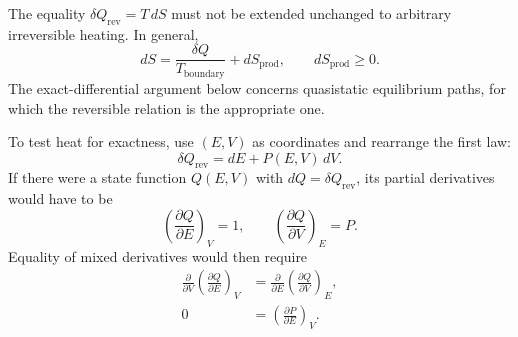 \begin{classroomqa}
\end{classroomqa}

The equality \(\delta Q_{\mathrm{rev}}=T\,dS\) must not be extended
unchanged to arbitrary irreversible heating.  In general,
\begin{equation}
 dS=\frac{\delta Q}{T_{\mathrm{boundary}}}+dS_{\mathrm{prod}},
 \qquad dS_{\mathrm{prod}}\ge 0.
 \label{eq:sm6-entropy-production}
\end{equation}
The exact-differential argument below concerns quasistatic equilibrium paths,
for which the reversible relation is the appropriate one.

\begin{classroomqa}
\end{classroomqa}

To test heat for exactness, use \((E,V)\) as coordinates and rearrange the
first law:
\begin{equation}
 \delta Q_{\mathrm{rev}}=dE+P(E,V)\,dV.
 \label{eq:sm6-heat-one-form}
\end{equation}
If there were a state function \(Q(E,V)\) with \(dQ=\delta Q_{\mathrm{rev}}\),
its partial derivatives would have to be
\begin{equation}
 \left(\frac{\partial Q}{\partial E}\right)_V=1,
 \qquad
 \left(\frac{\partial Q}{\partial V}\right)_E=P.
 \label{eq:sm6-hypothetical-heat-derivatives}
\end{equation}
Equality of mixed derivatives would then require
\begin{equation}
 \begin{aligned}
 \frac{\partial}{\partial V}
 \left(\frac{\partial Q}{\partial E}\right)_V
 &=\frac{\partial}{\partial E}
 \left(\frac{\partial Q}{\partial V}\right)_E,\\
 0&=\left(\frac{\partial P}{\partial E}\right)_V.
 \end{aligned}
 \label{eq:sm6-heat-exactness-requirement}
\end{equation}

